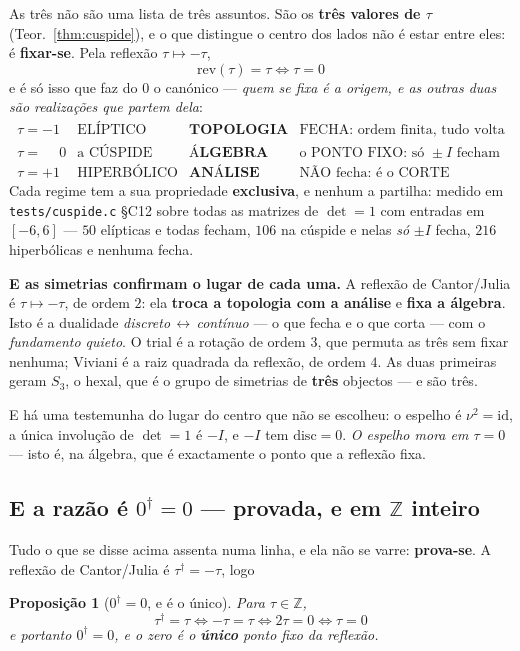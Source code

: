\documentclass[11pt,a4paper]{article}
\newtheorem{proposicao}[teorema]{Proposição}
\newcommand{\code}[1]{\texttt{\small #1}}
\newcommand{\dg}{^{\dagger}}
\begin{document}
As três não são uma lista de três assuntos. São os \textbf{três valores de $\tau$}
(Teor.~\ref{thm:cuspide}), e o que distingue o centro dos lados não é estar entre eles:
é \textbf{fixar-se}. Pela reflexão $\tau\mapsto-\tau$,
\[
\boxed{\;\mathrm{rev}(\tau)=\tau\iff\tau=0\;}
\]
e é só isso que faz do $0$ o canónico --- \emph{quem se fixa é a origem, e as outras duas
são realizações que partem dela}:
\[
\begin{array}{clll}
\tau=-1 & \text{ELÍPTICO} & \textbf{TOPOLOGIA} & \text{FECHA: ordem finita, tudo volta}\\[2pt]
\tau=\phantom{-}0 & \text{a CÚSPIDE} & \textbf{ÁLGEBRA} & \text{o PONTO FIXO: só }\pm I\text{ fecham}\\[2pt]
\tau=+1 & \text{HIPERBÓLICO} & \textbf{ANÁLISE} & \text{NÃO fecha: é o CORTE}
\end{array}
\]
Cada regime tem a sua propriedade \textbf{exclusiva}, e nenhum a partilha: medido em
\code{tests/cuspide.c} \S C12 sobre todas as matrizes de $\det=1$ com entradas em
$[-6,6]$ --- $50$ elípticas e todas fecham, $106$ na cúspide e nelas \emph{só} $\pm I$
fecha, $216$ hiperbólicas e nenhuma fecha.

\medskip
\noindent\textbf{E as simetrias confirmam o lugar de cada uma.} A reflexão de
Cantor/Julia é $\tau\mapsto-\tau$, de ordem $2$: ela \textbf{troca a topologia com a
análise} e \textbf{fixa a álgebra}. Isto é a dualidade \emph{discreto\,$\leftrightarrow$\,contínuo}
--- o que fecha e o que corta --- com o \emph{fundamento quieto}. O trial é a rotação de
ordem $3$, que permuta as três sem fixar nenhuma; Viviani é a raiz quadrada da reflexão,
de ordem $4$. As duas primeiras geram $S_3$, o hexal, que é o grupo de simetrias de
\textbf{três} objectos --- e são três.

E há uma testemunha do lugar do centro que não se escolheu: o espelho é $\nu^2=\mathrm{id}$,
a única involução de $\det=1$ é $-I$, e $-I$ tem $\mathrm{disc}=0$. \emph{O espelho mora
em $\tau=0$} --- isto é, na álgebra, que é exactamente o ponto que a reflexão fixa.

\subsection*{E a razão é $0\dg=0$ --- provada, e em $\mathbb{Z}$ inteiro}

Tudo o que se disse acima assenta numa linha, e ela não se varre: \textbf{prova-se}. A
reflexão de Cantor/Julia é $\tau\dg=-\tau$, logo

\begin{proposicao}[$0\dg=0$, e é o único]\label{prop:zero-dual-zero}
Para $\tau\in\mathbb{Z}$,
\[
\boxed{\;\tau\dg=\tau\iff-\tau=\tau\iff2\tau=0\iff\tau=0\;}
\]
e portanto $0\dg=0$, e o zero é o \textbf{único} ponto fixo da reflexão.
\end{proposicao}
\end{document}
